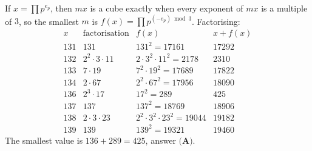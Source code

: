 If $x=\prod p^{e_p}$, then $mx$ is a cube exactly when every exponent of $mx$ is a multiple of $3$, so the smallest $m$ is $f(x)=\prod p^{(-e_p)\bmod 3}$. Factorising:
\[\begin{array}{c|c|c|c}
x&\text{factorisation}&f(x)&x+f(x)\\\hline
131&131&131^2=17161&17292\\
132&2^2\cdot3\cdot11&2\cdot3^2\cdot11^2=2178&2310\\
133&7\cdot19&7^2\cdot19^2=17689&17822\\
134&2\cdot67&2^2\cdot67^2=17956&18090\\
136&2^3\cdot17&17^2=289&425\\
137&137&137^2=18769&18906\\
138&2\cdot3\cdot23&2^2\cdot3^2\cdot23^2=19044&19182\\
139&139&139^2=19321&19460
\end{array}\]
The smallest value is $136+289=\boxed{425}$, answer $\textbf{(A)}$.

